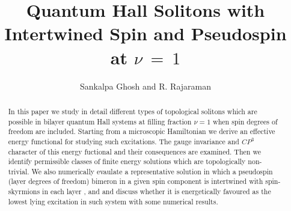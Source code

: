 			                             

\draft
\def \beq{\begin{equation}}
\def \eeq{\end{equation}}
\def \beqarr{\begin{eqnarray}}
\def \eeqarr{\end{eqnarray}}
\def\bc{\begin{center}}
\def\ec{\end{center}}
\def \ca{\cos \alpha }
\def \ct{\cos \theta_{u}}
\def \st{\sin \theta_{u}}
\bc 
\title  {Quantum Hall Solitons with Intertwined Spin and Pseudospin  
 at $\nu \ = \ 1$} 
\author{Sankalpa Ghosh and R. Rajaraman\cite{byline1}}

\address{School of Physical Sciences \\
Jawaharlal Nehru University\\ New Delhi 110067, \ INDIA\\ }

\maketitle

\ec
\begin{abstract}
In this paper we study in detail different types of topological
solitons which are possible in bilayer quantum Hall systems at filling 
fraction $\nu =1$ when spin degrees of freedom are included. Starting from a
microscopic Hamiltonian we  derive an effective energy functional
for studying such excitations. The gauge invariance and $CP^{3}$ character
of this energy fuctional and their consequences are examined.
 Then we identify permissible classes of 
finite energy solutions  which are topologically non-trivial. 
 We also numerically evaulate 
a representative solution in which a pseudospin (layer degrees of freedom)
bimeron in a given spin component is intertwined with spin-skyrmions 
in each layer ,  
and and discuss whether it is energetically favoured as
the lowest lying excitation in such system with some numerical results.
\end{abstract}
\vskip 16pt

